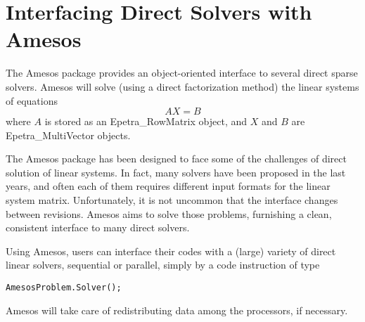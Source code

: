 % 
% 
% 
%   
%   
% 
% 

\section{Interfacing Direct Solvers with Amesos}
\label{chap:amesos}

The Amesos package provides an object-oriented interface to several
direct sparse solvers. Amesos will solve (using a direct factorization
method) the linear systems of equations
\begin{equation}
\label{eq:amesos_ls}
A X = B
\end{equation}
where $A$ is stored as an Epetra\_RowMatrix object, and $X$ and $B$ are
Epetra\_MultiVector objects.

The Amesos package has been designed to face some of the challenges of
direct solution of linear systems. In fact, many solvers have been
proposed in the last years, and often each of them requires different
input formats for the linear system matrix. Unfortunately, it is not
uncommon that the interface changes between revisions. Amesos aims to
solve those problems, furnishing a clean, consistent interface to many
direct solvers.

Using Amesos, users can interface their codes with a (large) variety of
direct linear solvers, sequential or parallel, simply by a code
instruction of type
\begin{verbatim}
AmesosProblem.Solver();
\end{verbatim}
Amesos will take care of redistributing data among the processors, if
necessary.

